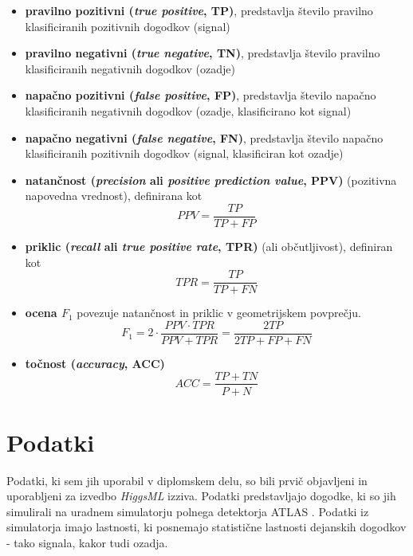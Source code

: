 \documentclass[11pt,a4paper,openany]{book}
\begin{document}
\begin{itemize}
	\item \textbf{pravilno pozitivni (\textit{true positive}, TP)}, predstavlja število pravilno klasificiranih pozitivnih dogodkov (signal)
	\item \textbf{pravilno negativni (\textit{true negative}, TN)}, predstavlja število pravilno klasificiranih negativnih dogodkov (ozadje)
	\item \textbf{napačno pozitivni (\textit{false positive}, FP)}, predstavlja število napačno klasificiranih negativnih dogodkov (ozadje, klasificirano kot signal)
	\item \textbf{napačno negativni (\textit{false negative}, FN)}, predstavlja število napačno klasificiranih pozitivnih dogodkov (signal, klasificiran kot ozadje)
	\item \textbf{natančnost (\textit{precision} ali \textit{positive prediction value}, PPV)} (pozitivna napovedna vrednost), definirana kot 
	\begin{equation}	
	PPV = \frac{TP}{TP + FP}
	\end{equation}
	\item \textbf{priklic (\textit{recall} ali \textit{true positive rate}, TPR)} (ali občutljivost), definiran kot
	\begin{equation}	
	TPR = \frac{TP}{TP + FN}
	\end{equation}
	\item \textbf{ocena $F_1$} povezuje natančnost in priklic v geometrijskem povprečju. 
	\begin{equation}
	F_1 = 2 \cdot \frac{PPV \cdot TPR}{PPV + TPR} = \frac{2TP}{2TP + FP + FN}
	\end{equation}
	\item \textbf{točnost (\textit{accuracy}, ACC)}
	\begin{equation}
	ACC = \frac{TP + TN}{P + N}
	\end{equation}
\end{itemize}

\chapter{Podatki}
\label{analiza-podatkov}
Podatki, ki sem jih uporabil v diplomskem delu, so bili prvič objavljeni in uporabljeni za izvedbo \textit{HiggsML} izziva. Podatki predstavljajo dogodke, ki so jih simulirali na uradnem simulatorju polnega detektorja ATLAS \cite{Adam-Bourdarios14}. Podatki iz simulatorja imajo lastnosti, ki posnemajo statistične lastnosti dejanskih dogodkov - tako signala, kakor tudi ozadja.
\end{document}
